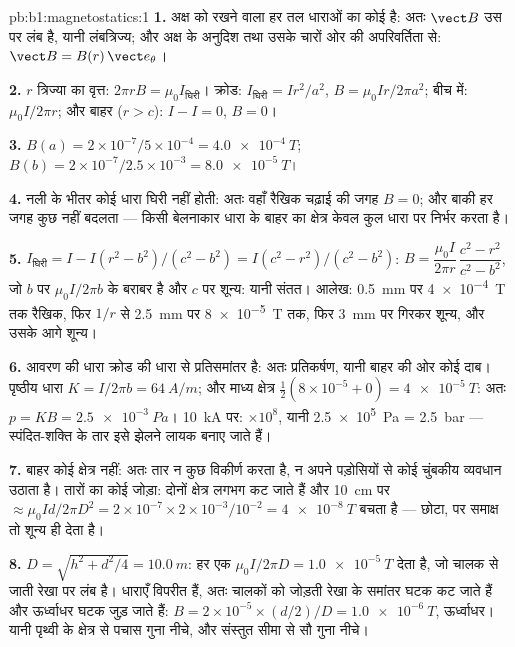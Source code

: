 \begin{solution}{pb:b1:magnetostatics:1}
\textbf{1.} अक्ष को रखने वाला हर तल धाराओं का कोई  है: अतः
$\vect B$ उस पर लंब है, यानी लंबत्रिज्य; और अक्ष के अनुदिश तथा उसके चारों ओर
की अपरिवर्तिता से: $\vect B = B(r)\,\vect e_\theta$।

\textbf{2.} $r$ त्रिज्या का वृत्त: $2\pi rB = \mu_0I_{\text{घिरी}}$। क्रोड:
$I_{\text{घिरी}} = Ir^2/a^2$, $B = \mu_0Ir/2\pi a^2$; बीच में: $\mu_0I/2\pi r$;
और बाहर ($r > c$): $I - I = 0$, $B = 0$।

\textbf{3.} $B(a) = 2 \times 10^{-7}/5 \times 10^{-4} = \qty{4.0e-4}{T}$; $B(b) = 2 \times
10^{-7}/2.5 \times 10^{-3} = \qty{8.0e-5}{T}$।

\textbf{4.} नली के भीतर कोई धारा घिरी नहीं होती: अतः वहाँ रैखिक चढ़ाई की जगह
$B = 0$; और बाकी हर जगह कुछ नहीं बदलता --- किसी बेलनाकार धारा के बाहर का
क्षेत्र केवल कुल धारा पर निर्भर करता है।

\textbf{5.} $I_{\text{घिरी}} = I - I(r^2 - b^2)/(c^2 - b^2) = I(c^2 - r^2)/(c^2 -
b^2)$: $B = \dfrac{\mu_0I}{2\pi r}\,\dfrac{c^2 - r^2}{c^2 - b^2}$, जो
$b$ पर $\mu_0I/2\pi b$ के बराबर है और $c$ पर शून्य: यानी संतत। आलेख: \qty{0.5}{mm} पर \qty{4e-4}{T}
तक रैखिक, फिर $1/r$ से \qty{2.5}{mm} पर \qty{8e-5}{T} तक, फिर \qty{3}{mm} पर
गिरकर शून्य, और उसके आगे शून्य।

\textbf{6.} आवरण की धारा क्रोड की धारा से प्रतिसमांतर है: अतः प्रतिकर्षण,
यानी बाहर की ओर कोई दाब। पृष्ठीय धारा $K = I/2\pi b = \qty{64}{A/m}$; और माध्य क्षेत्र
$\tfrac12(8 \times 10^{-5} + 0) = \qty{4e-5}{T}$: अतः $p = KB = \qty{2.5e-3}{Pa}$।
\qty{10}{kA} पर: $\times10^8$, यानी \qty{2.5e5}{Pa} = \qty{2.5}{bar} ---
स्पंदित-शक्ति के तार इसे झेलने लायक बनाए जाते हैं।

\textbf{7.} बाहर कोई क्षेत्र नहीं: अतः तार न कुछ विकीर्ण करता है, न अपने
पड़ोसियों से कोई चुंबकीय व्यवधान उठाता है। तारों का कोई जोड़ा: दोनों क्षेत्र
लगभग कट जाते हैं और \qty{10}{cm} पर $\approx \mu_0Id/2\pi D^2 = 2 \times 10^{-7} \times 2 \times
10^{-3}/10^{-2} = \qty{4e-8}{T}$ बचता है --- छोटा, पर समाक्ष तो शून्य ही
देता है।

\textbf{8.} $D = \sqrt{h^2 + d^2/4} = \qty{10.0}{m}$: हर एक $\mu_0I/2\pi D =
\qty{1.0e-5}{T}$ देता है, जो चालक से जाती रेखा पर लंब है। धाराएँ विपरीत हैं,
अतः चालकों को जोड़ती रेखा के समांतर घटक कट जाते हैं और ऊर्ध्वाधर घटक जुड़
जाते हैं: $B = 2 \times 10^{-5} \times
(d/2)/D = \qty{1.0e-6}{T}$, ऊर्ध्वाधर। यानी पृथ्वी के क्षेत्र से पचास गुना
नीचे, और संस्तुत सीमा से सौ गुना नीचे।


\end{solution}
